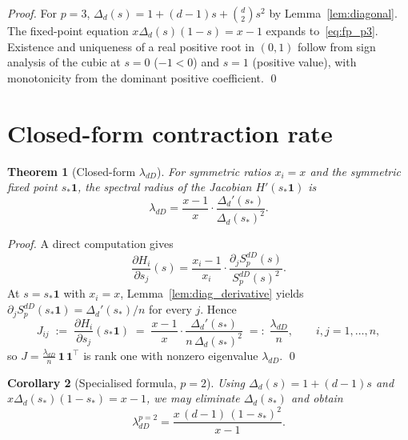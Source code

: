\documentclass[11pt,a4paper]{article}
\newtheorem{theorem}{Theorem}
\newtheorem{corollary}[theorem]{Corollary}
\theoremstyle{definition}
\theoremstyle{remark}
\newcommand{\one}{\mathbf{1}}
\begin{document}
\begin{proof}
For $p = 3$, $\Delta_d(s) = 1 + (d-1) s + \binom{d}{2} s^2$ by
Lemma~\ref{lem:diagonal}.  The fixed-point equation
$x \Delta_d(s)(1-s) = x-1$ expands to~\eqref{eq:fp_p3}.  Existence and
uniqueness of a real positive root in $(0, 1)$ follow from sign analysis
of the cubic at $s = 0$ ($-1 < 0$) and $s = 1$ (positive value), with
monotonicity from the dominant positive coefficient. \qed
\end{proof}

\section{Closed-form contraction rate}
\label{sec:rate}

\begin{theorem}[Closed-form $\lambda_{dD}$]
\label{thm:lambda_general}
For symmetric ratios $x_i = x$ and the symmetric fixed point $s_* \one$,
the spectral radius of the Jacobian $H'(s_* \one)$ is
\begin{equation}
  \label{eq:lambda_general}
  \lambda_{dD} = \frac{x - 1}{x} \cdot \frac{\Delta_d'(s_*)}{\Delta_d(s_*)^2}.
\end{equation}
\end{theorem}

\begin{proof}
A direct computation gives
\[
  \frac{\partial H_i}{\partial s_j}(s)
  = \frac{x_i - 1}{x_i} \cdot \frac{\partial_j S_p^{dD}(s)}{S_p^{dD}(s)^2}.
\]
At $s = s_* \one$ with $x_i = x$, Lemma~\ref{lem:diag_derivative} yields
$\partial_j S_p^{dD}(s_* \one) = \Delta_d'(s_*)/n$ for every $j$.  Hence
\[
  J_{ij} \;:=\; \frac{\partial H_i}{\partial s_j}(s_* \one)
  \;=\; \frac{x - 1}{x} \cdot \frac{\Delta_d'(s_*)}{n\, \Delta_d(s_*)^2}
  \;=:\; \frac{\lambda_{dD}}{n}, \qquad i, j = 1, \ldots, n,
\]
so $J = \frac{\lambda_{dD}}{n}\, \one\, \one^\top$ is rank one with
nonzero eigenvalue $\lambda_{dD}$. \qed
\end{proof}

\begin{corollary}[Specialised formula, $p = 2$]
\label{cor:lambda_p2}
Using $\Delta_d(s) = 1 + (d-1) s$ and $x \Delta_d(s_*)(1 - s_*) = x - 1$,
we may eliminate $\Delta_d(s_*)$ and obtain
\begin{equation}
  \label{eq:lambda_p2}
  \lambda_{dD}^{p=2} = \frac{x\, (d - 1)\, (1 - s_*)^2}{x - 1}.
\end{equation}
\end{corollary}
\end{document}
